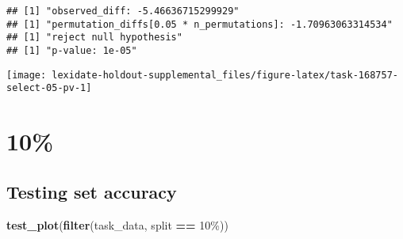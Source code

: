 \documentclass[
]{book}
\newenvironment{Shaded}{\begin{snugshade}}{\end{snugshade}}
\newcommand{\AttributeTok}[1]{\textcolor[rgb]{0.13,0.29,0.53}{#1}}
\newcommand{\DecValTok}[1]{\textcolor[rgb]{0.00,0.00,0.81}{#1}}
\newcommand{\FunctionTok}[1]{\textcolor[rgb]{0.13,0.29,0.53}{\textbf{#1}}}
\newcommand{\NormalTok}[1]{#1}
\newcommand{\OtherTok}[1]{\textcolor[rgb]{0.56,0.35,0.01}{#1}}
\newcommand{\SpecialCharTok}[1]{\textcolor[rgb]{0.81,0.36,0.00}{\textbf{#1}}}
\newcommand{\StringTok}[1]{\textcolor[rgb]{0.31,0.60,0.02}{#1}}
\begin{document}
\begin{Shaded}
\end{Shaded}

\begin{verbatim}
## [1] "observed_diff: -5.46636715299929"
## [1] "permutation_diffs[0.05 * n_permutations]: -1.70963063314534"
## [1] "reject null hypothesis"
## [1] "p-value: 1e-05"
\end{verbatim}

\texttt{[image: lexidate-holdout-supplemental\_files/figure-latex/task-168757-select-05-pv-1]}

\hypertarget{section-21}{%
\section{10\%}\label{section-21}}

\hypertarget{testing-set-accuracy-21}{%
\subsection{Testing set accuracy}\label{testing-set-accuracy-21}}

\begin{Shaded}
\begin{Highlighting}[]
\FunctionTok{test\_plot}\NormalTok{(}\FunctionTok{filter}\NormalTok{(task\_data, split }\SpecialCharTok{==} \StringTok{\textquotesingle{}10\%\textquotesingle{}}\NormalTok{))}
\end{Highlighting}
\end{Shaded}
\end{document}
